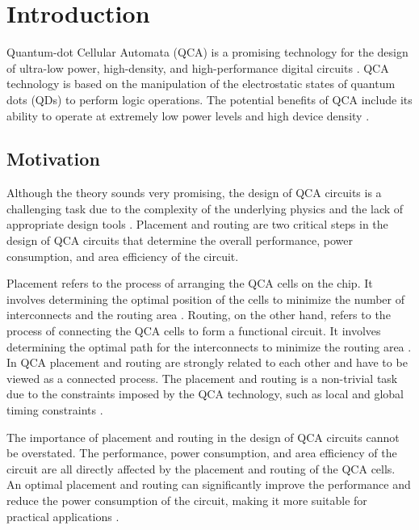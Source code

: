 
\chapter{Introduction}\label{chapter:introduction}
Quantum-dot Cellular Automata (QCA) is a promising technology for the design of ultra-low power, high-density, and high-performance digital circuits \cite{perri2012new}. QCA technology is based on the manipulation of the electrostatic states of quantum dots (QDs) to perform logic operations. The potential benefits of QCA include its ability to operate at extremely low power levels and high device density \cite{sen2015towards}.

\section{Motivation}
Although the theory sounds very promising, the design of QCA circuits is a challenging task due to the complexity of the underlying physics and the lack of appropriate design tools \cite{safoev2020design}. Placement and routing are two critical steps in the design of QCA circuits that determine the overall performance, power consumption, and area efficiency of the circuit.

Placement refers to the process of arranging the QCA cells on the chip. It involves determining the optimal position of the cells to minimize the number of interconnects and the routing area \cite{kahng2011vlsi}. Routing, on the other hand, refers to the process of connecting the QCA cells to form a functional circuit. It involves determining the optimal path for the interconnects to minimize the routing area \cite{kahng2011vlsi}. In QCA placement and routing are strongly related to each other and have to be viewed as a connected process. The placement and routing is a non-trivial task due to the constraints imposed by the QCA technology, such as local and global timing constraints \cite{ortho}.

The importance of placement and routing in the design of QCA circuits cannot be overstated. The performance, power consumption, and area efficiency of the circuit are all directly affected by the placement and routing of the QCA cells. An optimal placement and routing can significantly improve the performance and reduce the power consumption of the circuit, making it more suitable for practical applications \cite{walter2018exact}.

